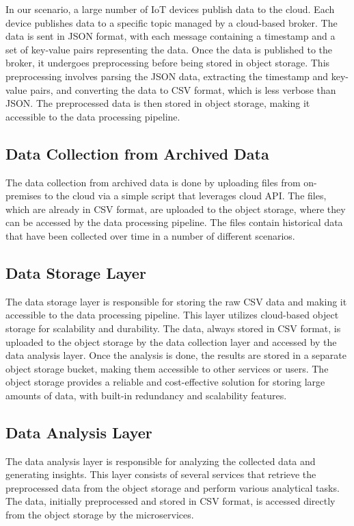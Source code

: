 In our scenario, a large number of IoT devices publish data to the cloud. Each device publishes data to a specific topic managed by a cloud-based broker. The data is sent in JSON format, with each message containing a timestamp and a set of key-value pairs representing the data. Once the data is published to the broker, it undergoes preprocessing before being stored in object storage. This preprocessing involves parsing the JSON data, extracting the timestamp and key-value pairs, and converting the data to CSV format, which is less verbose than JSON. The preprocessed data is then stored in object storage, making it accessible to the data processing pipeline.


\subsection{Data Collection from Archived Data}
The data collection from archived data is done by uploading files from on-premises to the cloud via a simple script that leverages cloud API. The files, which are already in CSV format, are uploaded to the object storage, where they can be accessed by the data processing pipeline. The files contain historical data that have been collected over time in a number of different scenarios.

\subsection{Data Storage Layer}

The data storage layer is responsible for storing the raw CSV data and making it accessible to the data processing pipeline. This layer utilizes cloud-based object storage for scalability and durability. The data, always stored in CSV format, is uploaded to the object storage by the data collection layer and accessed by the data analysis layer.
Once the analysis is done, the results are stored in a separate object storage bucket, making them accessible to other services or users.
The object storage provides a reliable and cost-effective solution for storing large amounts of data, with built-in redundancy and scalability features.

\subsection{Data Analysis Layer}

The data analysis layer is responsible for analyzing the collected data and generating insights. This layer consists of several services that retrieve the preprocessed data from the object storage and perform various analytical tasks. The data, initially preprocessed and stored in CSV format, is accessed directly from the object storage by the microservices.


